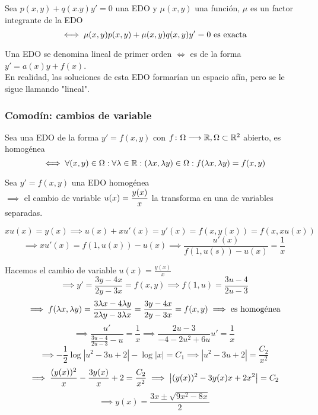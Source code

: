 \begin{defn}
	Sea $p(x,y) + q(x.y)y'=0$ una EDO y $\mu(x,y)$ una función, $\mu$ es un factor integrante de la EDO
	\[\iff \mu(x,y)p(x,y)+\mu(x,y)q(x,y)y'=0 \text{ es exacta}\]
\end{defn}
\begin{defn}
	Una EDO se denomina lineal de primer orden $\iff$ es de la forma $y'=a(x)y+f(x)$. \\
	\indent En realidad, las soluciones de esta EDO formarían un espacio afín, pero se le sigue llamando "lineal".
\end{defn}
\subsubsection{Comodín: cambios de variable}
\begin{defn}
	Sea una EDO de la forma $y'=f(x,y)$ con $f \colon \Omega \longrightarrow \mathbb{R}, \Omega \subset \mathbb{R}^2$ abierto, es homogénea
	\[\iff \forall (x, y) \in \Omega : \forall \lambda\in \mathbb{R} : (\lambda x, \lambda y) \in \Omega : f(\lambda x, \lambda y) = f(x,y)\]
\end{defn}

\begin{prop}
	Sea $y'=f(x,y)$ una EDO homogénea \\
	$\implies$ el cambio de variable $\displaystyle u(x)=\frac{y(x)}{x}$ la transforma en una de variables separadas.
	\begin{dem}
		\[xu(x)=y(x) \implies u(x)+xu'(x)=y'(x)=f(x, y(x))=f(x, xu(x))\]
		\[\implies xu'(x)=f(1, u(x))-u(x) \implies \frac{u'(x)}{f(1, u(s))-u(x)}=\frac{1}{x}\]
	\end{dem}
\end{prop}
\begin{ejem}[$4x-3y+y'(2y-3x)=0$]
	Hacemos el cambio de variable $u(x)=\frac{y(x)}{x}$
	\[\implies y'=\frac{3y-4x}{2y-3x}=f(x,y) \implies f(1, u)=\frac{3u-4}{2u-3}\]
	\[\implies f(\lambda x, \lambda y)=\frac{3\lambda x-4\lambda y}{2\lambda y-3\lambda x}=\frac{3y-4x}{2y-3x}=f(x,y) \implies \text{es homogénea}\]
	\[\implies \frac{u'}{\frac{3u-4}{2u-3}-u}=\frac{1}{x} \implies \frac{2u-3}{-4-2u^2+6u}u'=\frac{1}{x}\]
	\[\implies -\frac{1}{2}\log{|u^2-3u+2|}-\log{|x|}=C_1 \implies |u^2-3u+2|=\frac{C_2}{x^2}\]
	\[\implies \frac{(y(x))^2}{x}-\frac{3y(x)}{x}+2=\frac{C_2}{x^2} \implies \left|(y(x))^2-3y(x)x+2x^2\right|=C_2\]
	\[\implies \boxed{y(x)=\frac{3x\pm \sqrt{9x^2-8x}}{2}}\]
\end{ejem}

